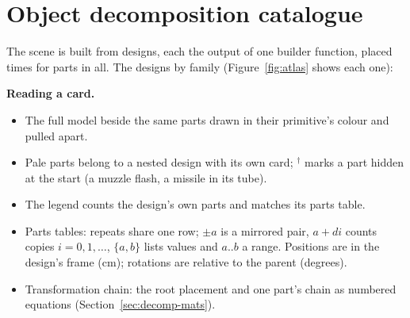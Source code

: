 \section{Object decomposition catalogue}
\label{sec:decomp}
The scene is built from \nDesigns{} designs, each the output of one builder function, placed \nDesignInstances{}
times for \sceneParts{} parts in all. The designs by family (Figure~\ref{fig:atlas} shows each one):
\designfamilies

\textbf{Reading a card.}
\begin{itemize}
\item The full model beside the same parts drawn in their primitive's colour and pulled apart.
\item Pale parts belong to a nested design with its own card; $^\dagger$ marks a part hidden at the start (a muzzle
flash, a missile in its tube).
\item The legend counts the design's own parts and matches its parts table.
\item Parts tables: repeats share one row; $\pm a$ is a mirrored pair, $a{+}di$ counts copies $i=0,1,\dots$, $\{a,b\}$
lists values and $a..b$ a range. Positions are in the design's frame (cm); rotations are relative to the parent (degrees).
\item Transformation chain: the root placement and one part's chain as numbered equations (Section~\ref{sec:decomp-mats}).
\end{itemize}


